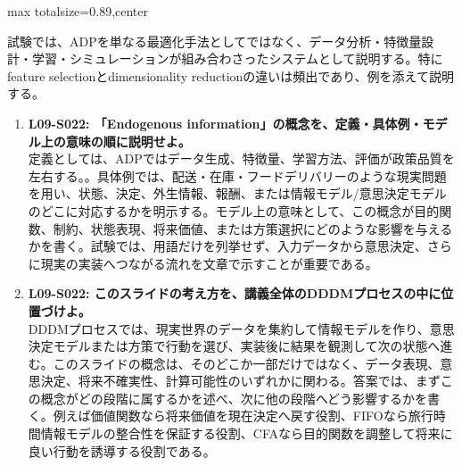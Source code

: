 \begin{minipage}[t]{0.58\textwidth}
\begin{adjustbox}{max totalsize={\textwidth}{0.89\textheight},center}
\begin{minipage}{\textwidth}
試験では、ADPを単なる最適化手法としてではなく、データ分析・特徴量設計・学習・シミュレーションが組み合わさったシステムとして説明する。特にfeature selectionとdimensionality reductionの違いは頻出であり、例を添えて説明する。\par{}\begin{enumerate}\item \textbf{L09-S022: 「Endogenous information」の概念を、定義・具体例・モデル上の意味の順に説明せよ。}\\定義としては、ADPではデータ生成、特徴量、学習方法、評価が政策品質を左右する。。具体例では、配送・在庫・フードデリバリーのような現実問題を用い、状態、決定、外生情報、報酬、または情報モデル/意思決定モデルのどこに対応するかを明示する。モデル上の意味として、この概念が目的関数、制約、状態表現、将来価値、または方策選択にどのような影響を与えるかを書く。試験では、用語だけを列挙せず、入力データから意思決定、さらに現実の実装へつながる流れを文章で示すことが重要である。\item \textbf{L09-S022: このスライドの考え方を、講義全体のDDDMプロセスの中に位置づけよ。}\\DDDMプロセスでは、現実世界のデータを集約して情報モデルを作り、意思決定モデルまたは方策で行動を選び、実装後に結果を観測して次の状態へ進む。このスライドの概念は、そのどこか一部だけではなく、データ表現、意思決定、将来不確実性、計算可能性のいずれかに関わる。答案では、まずこの概念がどの段階に属するかを述べ、次に他の段階へどう影響するかを書く。例えば価値関数なら将来価値を現在決定へ戻す役割、FIFOなら旅行時間情報モデルの整合性を保証する役割、CFAなら目的関数を調整して将来に良い行動を誘導する役割である。\end{enumerate}
\end{minipage}
\end{adjustbox}
\end{minipage}


